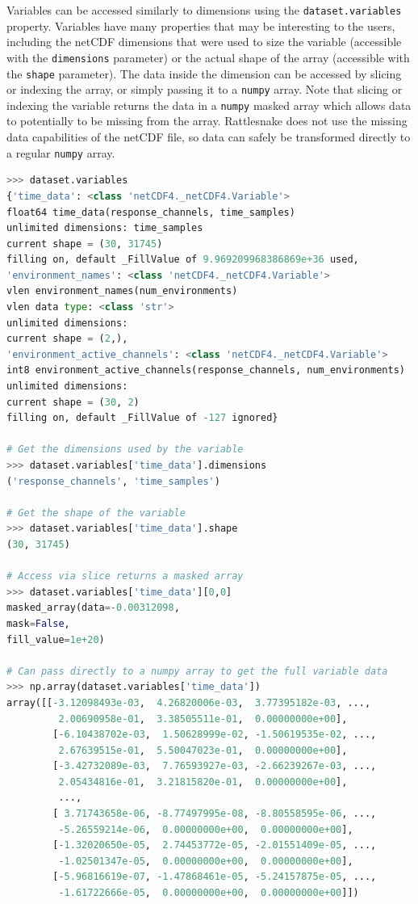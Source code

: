 \documentclass[pdf,12pt,report]{SANDreport}
\newcommand{\inlineCode}{\lstinline[basicstyle=\bfseries\ttfamily]}
\begin{document}
    Variables can be accessed similarly to dimensions using the \inlineCode{dataset.variables} property.  Variables have many properties that may be interesting to the users, including the netCDF dimensions that were used to size the variable (accessible with the \inlineCode{dimensions} parameter) or the actual shape of the array (accessible with the \inlineCode{shape} parameter).  The data inside the dimension can be accessed by slicing or indexing the array, or simply passing it to a \inlineCode{numpy} array.  Note that slicing or indexing the variable returns the data in a \inlineCode{numpy} masked array which allows data to potentially to be missing from the array.  Rattlesnake does not use the missing data capabilities of the netCDF file, so data can safely be transformed directly to a regular \inlineCode{numpy} array.
    
\begin{lstlisting}[language=Python,numbers=none]
>>> dataset.variables
{'time_data': <class 'netCDF4._netCDF4.Variable'>
float64 time_data(response_channels, time_samples)
unlimited dimensions: time_samples
current shape = (30, 31745)
filling on, default _FillValue of 9.969209968386869e+36 used,
'environment_names': <class 'netCDF4._netCDF4.Variable'>
vlen environment_names(num_environments)
vlen data type: <class 'str'>
unlimited dimensions: 
current shape = (2,),
'environment_active_channels': <class 'netCDF4._netCDF4.Variable'>
int8 environment_active_channels(response_channels, num_environments)
unlimited dimensions: 
current shape = (30, 2)
filling on, default _FillValue of -127 ignored}

# Get the dimensions used by the variable
>>> dataset.variables['time_data'].dimensions
('response_channels', 'time_samples')

# Get the shape of the variable
>>> dataset.variables['time_data'].shape
(30, 31745)

# Access via slice returns a masked array
>>> dataset.variables['time_data'][0,0]
masked_array(data=-0.00312098,
mask=False,
fill_value=1e+20)

# Can pass directly to a numpy array to get the full variable data
>>> np.array(dataset.variables['time_data'])
array([[-3.12098493e-03,  4.26820006e-03,  3.77395182e-03, ...,
         2.00690958e-01,  3.38505511e-01,  0.00000000e+00],
        [-6.10438702e-03,  1.50628999e-02, -1.50619535e-02, ...,
         2.67639515e-01,  5.50047023e-01,  0.00000000e+00],
        [-3.42732089e-03,  7.76593927e-03, -2.66239267e-03, ...,
         2.05434816e-01,  3.21815820e-01,  0.00000000e+00],
         ...,
        [ 3.71743658e-06, -8.77497995e-08, -8.80558595e-06, ...,
         -5.26559214e-06,  0.00000000e+00,  0.00000000e+00],
        [-1.32020650e-05,  2.74453772e-05, -2.01551409e-05, ...,
         -1.02501347e-05,  0.00000000e+00,  0.00000000e+00],
        [-5.96816619e-07, -1.47868461e-05, -5.24157875e-05, ...,
         -1.61722666e-05,  0.00000000e+00,  0.00000000e+00]])
\end{lstlisting}
    
\end{document}
